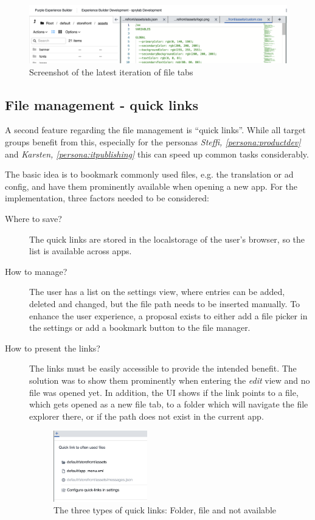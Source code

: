 \begin{figure}[h!]
  \includegraphics[width=\textwidth]{pics/file_tabs.png}
  \caption{Screenshot of the latest iteration of file tabs}
  \label{fig:file-tabs}
\end{figure}

\subsection{File management - quick links}

A second feature regarding the file management is ``quick links''. While all target groups benefit from this, especially for the personas \textit{Steffi, \ref{persona:productdev}} and \textit{Karsten, \ref{persona:itpublishing}}
this can speed up common tasks considerably.

The basic idea is to bookmark commonly used files, e.g. the translation or ad config, and have them prominently available when opening a new app.
For the implementation, three factors needed to be considered:
\begin{description}
  \item[Where to save?] The quick links are stored in the \Gls{localstorage} of the user's browser, so the list is available across apps.
  \item[How to manage?] The user has a list on the settings view, where entries can be added, deleted and changed, but the file path needs to be inserted manually. To enhance the user experience, a proposal exists to either add a file picker in the settings or add a bookmark button to the file manager.
  \item[How to present the links?] The links must be easily accessible to provide the intended benefit. The solution was to show them prominently when entering the \textit{edit} view and no file was opened yet.
  In addition, the UI shows if the link points to a file, which gets opened as a new file tab, to a folder which will navigate the file explorer there, or if the path does not exist in the current app.
  \begin{figure}[h!]
    \centering
    \includegraphics[width=0.4\textwidth]{pics/quick_links.png}
    \caption{The three types of quick links: Folder, file and not available}
  \end{figure}
\end{description}

